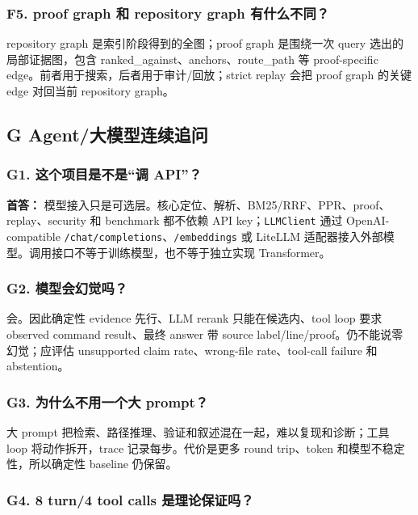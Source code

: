 \documentclass[UTF8,12pt,openany]{ctexbook}
\begin{document}
\subsubsection{F5. proof graph 和 repository graph 有什么不同？}

repository graph 是索引阶段得到的全图；proof graph 是围绕一次 query 选出的局部证据图，包含 ranked\_against、anchors、route\_path 等 proof-specific edge。前者用于搜索，后者用于审计/回放；strict replay 会把 proof graph 的关键 edge 对回当前 repository graph。\par

\subsection{G Agent/大模型连续追问}

\subsubsection{G1. 这个项目是不是“调 API”？}

\textbf{首答：} 模型接入只是可选层。核心定位、解析、BM25/RRF、PPR、proof、replay、security 和 benchmark 都不依赖 API key；\texttt{LLMClient} 通过 OpenAI-compatible \texttt{/chat/completions}、\texttt{/embeddings} 或 LiteLLM 适配器接入外部模型。调用接口不等于训练模型，也不等于独立实现 Transformer。\par

\subsubsection{G2. 模型会幻觉吗？}

会。因此确定性 evidence 先行、LLM rerank 只能在候选内、tool loop 要求 observed command result、最终 answer 带 source label/line/proof。仍不能说零幻觉；应评估 unsupported claim rate、wrong-file rate、tool-call failure 和 abstention。\par

\subsubsection{G3. 为什么不用一个大 prompt？}

大 prompt 把检索、路径推理、验证和叙述混在一起，难以复现和诊断；工具 loop 将动作拆开，trace 记录每步。代价是更多 round trip、token 和模型不稳定性，所以确定性 baseline 仍保留。\par

\subsubsection{G4. 8 turn/4 tool calls 是理论保证吗？}
\end{document}
